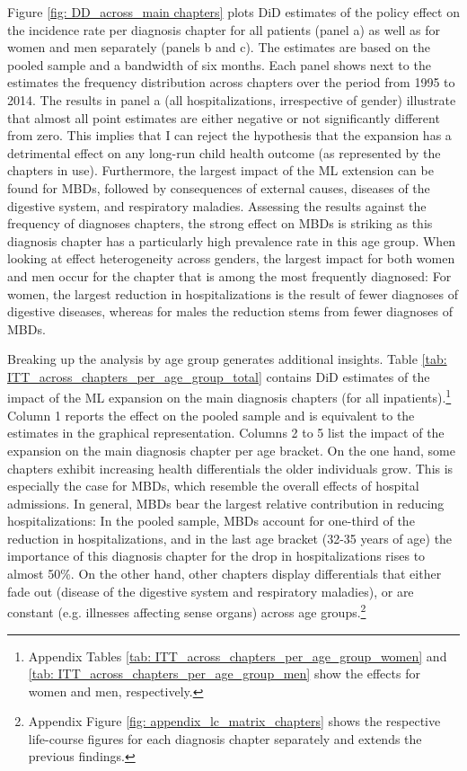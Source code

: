 \documentclass[11pt, a4paper, draft]{article} %
\begin{document}
Figure \ref{fig: DD_across_main chapters} plots DiD estimates of the policy effect on the incidence rate per diagnosis chapter for all patients (panel a) as well as for women and men separately (panels b and c). The estimates are based on the pooled sample and a bandwidth of six months. Each panel shows next to the estimates the frequency distribution across chapters over the period from 1995 to 2014. The results in panel a (all hospitalizations, irrespective of gender) illustrate that almost all point estimates are either negative or not significantly different from zero. This implies that I can reject the hypothesis that the expansion has a detrimental effect on any long-run child health outcome (as represented by the chapters in use). Furthermore, the largest impact of the ML extension can be found for MBDs, followed by consequences of external causes, diseases of the digestive system, and respiratory maladies. Assessing the results against the frequency of diagnoses chapters, the strong effect on MBDs is striking as this diagnosis chapter has a particularly high prevalence rate in this age group. When looking at effect heterogeneity across genders, the largest impact for both women and men occur for the chapter that is among the most frequently diagnosed: For women, the largest reduction in hospitalizations is the result of fewer diagnoses of digestive diseases, whereas for males the reduction stems from fewer diagnoses of MBDs. 

%
Breaking up the analysis by age group generates additional insights. Table \ref{tab: ITT_across_chapters_per_age_group_total} contains DiD estimates of the impact of the ML expansion on the main diagnosis chapters (for all inpatients).\footnote{Appendix Tables \ref{tab: ITT_across_chapters_per_age_group_women} and \ref{tab: ITT_across_chapters_per_age_group_men} show the effects for women and men, respectively.} Column 1 reports the effect on the pooled sample and is equivalent to the estimates in the graphical representation. Columns 2 to 5 list the impact of the expansion on the main diagnosis chapter per age bracket. On the one hand, some chapters exhibit increasing health differentials the older individuals grow. This is especially the case for MBDs, which resemble the overall effects of hospital admissions. In general, MBDs bear the largest relative contribution in reducing hospitalizations: In the pooled sample, MBDs account for one-third of the reduction in hospitalizations, and in the last age bracket (32-35 years of age) the importance of this diagnosis chapter for the drop in hospitalizations rises to almost 50\%. On the other hand, other chapters display differentials that either fade out (disease of the digestive system and respiratory maladies), or are constant (e.g. illnesses affecting sense organs) across age groups.\footnote{Appendix Figure \ref{fig: appendix_lc_matrix_chapters} shows the respective life-course figures for each diagnosis chapter separately and extends the previous findings.} 
\end{document}
